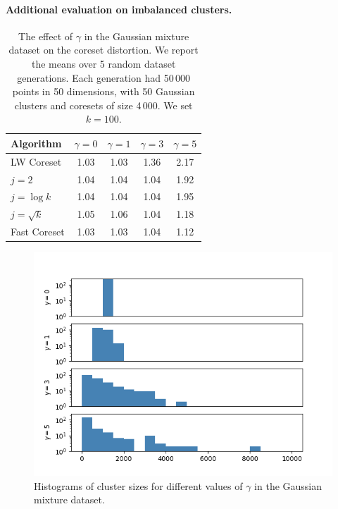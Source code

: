 

\paragraph*{Additional evaluation on imbalanced clusters.}

\begin{table}[htbp]
    \centering
    \begin{tabular}{lcccc}
        Algorithm & $\gamma = 0$ & $\gamma = 1$ & $\gamma = 3$ & $\gamma = 5$\\
        \hline
        LW Coreset & 1.03 & 1.03 & 1.36 & 2.17\\
        $j=2$ & 1.04 & 1.04 & 1.04 & 1.92\\
        $j=\log k$ & 1.04 & 1.04 & 1.04 & 1.95\\
        $j=\sqrt{k}$ & 1.05 & 1.06 & 1.04 & 1.18\\
        Fast Coreset & 1.03 & 1.03 & 1.04 & 1.12
    \end{tabular}
    \caption{The effect of $\gamma$ in the Gaussian mixture dataset on the coreset distortion. We report the means over 5 random dataset generations.
    Each generation had 50\,000 points in 50 dimensions, with 50 Gaussian clusters and coresets of size 4\,000. We set $k=100$.}
        \label{tbl:class-imbalance}
\end{table}
\begin{figure}[htbp]
    \centering
    \includegraphics[width=\linewidth]{images/effect_of_gamma.png}
    \caption{Histograms of cluster sizes for different values of $\gamma$ in the Gaussian mixture dataset.}
        \label{fig:effect-of-gamma}
\end{figure}

